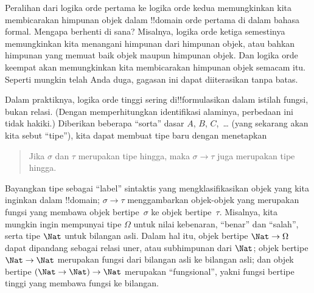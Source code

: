 \documentclass[../../../include/open-logic-section]{subfiles}
\begin{document}


Peralihan dari logika orde pertama ke logika orde kedua memungkinkan kita
membicarakan himpunan objek dalam !!{domain} orde pertama di dalam bahasa
formal. Mengapa berhenti di sana? Misalnya, logika orde ketiga semestinya
memungkinkan kita menangani himpunan dari himpunan objek, atau bahkan himpunan
yang memuat baik objek maupun himpunan objek. Dan logika orde keempat akan
memungkinkan kita membicarakan himpunan objek semacam itu. Seperti mungkin
telah Anda duga, gagasan ini dapat diiterasikan tanpa batas.

Dalam praktiknya, logika orde tinggi sering di!!{formula}{}sikan dalam istilah
fungsi, bukan relasi. (Dengan memperhitungkan identifikasi alaminya, perbedaan
ini tidak hakiki.) Diberikan beberapa ``sorta'' dasar $A$, $B$, $C$,~\dots
(yang sekarang akan kita sebut ``tipe''), kita dapat membuat tipe baru dengan
menetapkan
\begin{quote}
Jika $\sigma$ dan $\tau$ merupakan tipe hingga, maka $\sigma \to \tau$ juga
merupakan tipe hingga.
\end{quote}
Bayangkan tipe sebagai ``label'' sintaktis yang mengklasifikasikan objek yang
kita inginkan dalam !!{domain}; $\sigma \to \tau$ menggambarkan objek-objek
yang merupakan fungsi yang membawa objek bertipe~$\sigma$ ke objek
bertipe~$\tau$. Misalnya, kita mungkin ingin mempunyai tipe $\Omega$ untuk
nilai kebenaran, ``benar'' dan ``salah'', serta tipe $\Nat$ untuk bilangan
asli. Dalam hal itu, objek bertipe $\Nat \to \Omega$ dapat dipandang sebagai
relasi uner, atau subhimpunan dari $\Nat$; objek bertipe $\Nat \to \Nat$
merupakan fungsi dari bilangan asli ke bilangan asli; dan objek bertipe
$(\Nat \to \Nat) \to \Nat$ merupakan ``fungsional'', yakni fungsi bertipe
tinggi yang membawa fungsi ke bilangan.
\end{document}
